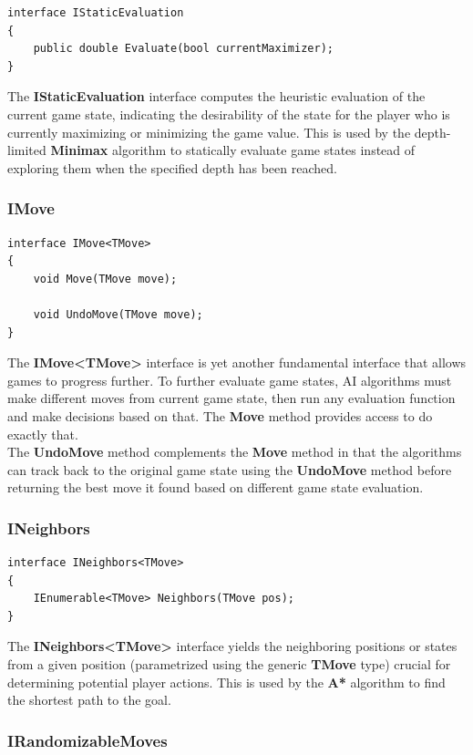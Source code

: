 \begin{lstlisting}
interface IStaticEvaluation
{
    public double Evaluate(bool currentMaximizer);
}
\end{lstlisting}
The \textbf{IStaticEvaluation} interface computes the heuristic evaluation of the current game state, indicating the desirability of the state for the player who is currently maximizing or minimizing the game value. This is used by the depth-limited \textbf{Minimax} algorithm to statically evaluate game states instead of exploring them when the specified depth has been reached.

\subsubsection{IMove}

\begin{lstlisting}
interface IMove<TMove>
{
    void Move(TMove move);

    void UndoMove(TMove move);
}
\end{lstlisting}
The \textbf{IMove\textless{}TMove\textgreater{}} interface is yet another fundamental interface that allows games to progress further. To further evaluate game states, \gls{AI} algorithms must make different moves from current game state, then run any evaluation function and make decisions based on that. The \textbf{Move} method provides access to do exactly that.\\
The \textbf{UndoMove} method complements the \textbf{Move} method in that the algorithms can track back to the original game state using the \textbf{UndoMove} method before returning the best move it found based on different game state evaluation.

\subsubsection{INeighbors}

\begin{lstlisting}
interface INeighbors<TMove>
{
    IEnumerable<TMove> Neighbors(TMove pos);
}
\end{lstlisting}
The \textbf{INeighbors\textless{}TMove\textgreater{}} interface yields the neighboring positions or states from a given position (parametrized using the generic \textbf{TMove} type) crucial for determining potential player actions. This is used by the \textbf{A*} algorithm to find the shortest path to the goal.

\subsubsection{IRandomizableMoves}

